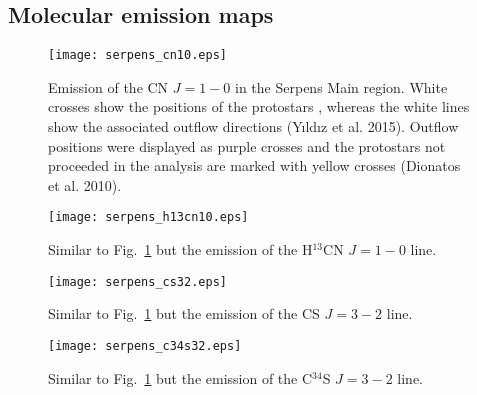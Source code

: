 \documentclass{aa}
\begin{document}
\begin{appendix} %
\section{Molecular emission maps}
\begin{figure}
\texttt{[image: serpens\_cn10.eps]}
\caption{Emission of the CN $J=1-0$ in the Serpens Main region. White crosses show the positions of the protostars \citep{Sur16}, whereas the white lines show the associated outflow directions (Y{\i}ld{\i}z et al. 2015). Outflow positions were displayed as purple crosses and the protostars not proceeded in the analysis are marked with yellow crosses (Dionatos et al. 2010).}
\label{cn10}
\end{figure}

\begin{figure}
\texttt{[image: serpens\_h13cn10.eps]}
\caption{Similar to Fig.~\ref{cn10} but the emission of the H$^{13}$CN $J=1-0$ line.}
\label{h13cn10}
\end{figure}

\begin{figure}
\texttt{[image: serpens\_cs32.eps]}
\caption{Similar to Fig.~\ref{cn10} but the emission of the CS $J=3-2$ line.}
\label{cs32}
\end{figure}

\begin{figure}
\texttt{[image: serpens\_c34s32.eps]}
\caption{Similar to Fig.~\ref{cn10} but the emission of the C$^{34}$S $J=3-2$ line.}
\label{c34s32}
\end{figure}

\end{appendix}
\end{document}

